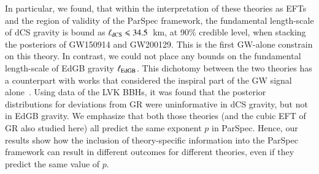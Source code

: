 \documentclass[twocolumn,
               prd,
               aps,
               superscriptaddress,
               tightenlines,
               nofootinbib,
               eqsecnum,
               amsfonts,
               amsmath,
               longbibliography]{revtex4-1}
\newcommand{\hscomm}[1]{{\textcolor{TealBlue}{{[HS: #1]}}}}
\newcommand{\abcomm}[1]{{\textcolor{red}{{[AB: #1]}}}}
\begin{document}
In particular, we found, that within the interpretation of these theories as EFTs and the
region of validity of the ParSpec framework, the fundamental length-scale of dCS gravity is bound as
$\ell_{\rm dCS} \leqslant 34.5$~km, at 90\% credible level, when stacking the posteriors
of GW150914 and GW200129. This is the first GW-alone constrain on this theory.
%
In contrast, we could not place any bounds on the fundamental length-scale
of EdGB gravity $\ell_{\rm EdGB}$.
%
This dichotomy between the two theories has a counterpart with works that considered
the inspiral part of the GW signal alone~\cite{Nair:2019iur,Perkins:2021mhb,Lyu:2022gdr}.
%
Using data of the LVK BBHs, it was found that the posterior distributions for
deviations from GR were uninformative in dCS gravity, but not in EdGB gravity.
We emphasize that both those theories (and the cubic EFT of GR also studied here) all predict the same exponent $p$ in ParSpec.
%
Hence, our results show how the inclusion of theory-specific information into the ParSpec framework
can result in different outcomes for different theories, even if they predict the same value of $p$.

\end{document}
